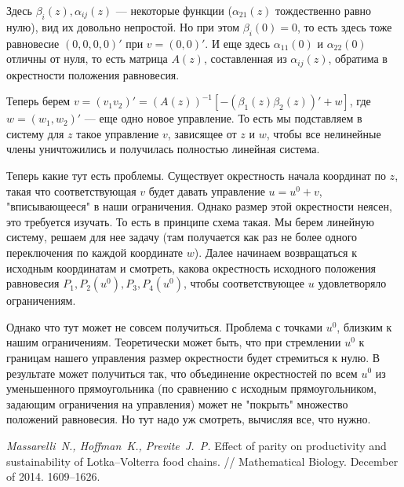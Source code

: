 \documentclass[11pt]{article}
\begin{document}
Здесь $\beta_i(z), \alpha_{ij}(z)$ --- некоторые функции ($\alpha_{21}(z)$ тождественно равно нулю), вид их довольно непростой.
Но при этом $\beta_i(0)=0$, то есть здесь тоже равновесие $(0,0,0,0)'$ при $v=(0,0)'$. И еще здесь $\alpha_{11}(0)$ и $\alpha_{22}(0)$ отличны от нуля, то есть матрица $A(z)$, составленная из $\alpha_{ij}(z)$, обратима в окрестности положения равновесия.

Теперь берем $v=(v_1 v_2)'=(A(z))^{-1}[-(\beta_1(z) \beta_2(z))'+w]$, где $w=(w_1,w_2)'$ --- еще одно новое управление.
То есть мы подставляем в систему для $z$ такое управление $v$, зависящее от $z$ и $w$, чтобы все нелинейные члены
уничтожились и получилась полностью линейная система.

Теперь какие тут есть проблемы. Существует окрестность начала координат по $z$, такая что соответствующая $v$ будет давать управление $u=u^0+v$, "вписывающееся" в наши ограничения. Однако размер этой окрестности неясен, это требуется изучать.
То есть в принципе схема такая. Мы берем линейную систему, решаем для нее задачу (там получается как раз не более
одного переключения по каждой координате $w$). Далее начинаем возвращаться к исходным координатам и смотреть,
какова окрестность исходного положения равновесия $P_1, P_2(u^0), P_3, P_4(u^0)$, чтобы соответствующее $u$ удовлетворяло
ограничениям.

Однако что тут может не совсем получиться. Проблема с точками $u^0$, близким к нашим ограничениям. Теоретически
может быть, что при стремлении $u^0$ к границам нашего управления размер окрестности будет стремиться к нулю.
В результате может получиться так, что объединение окрестностей по всем $u^0$ из уменьшенного прямоугольника
(по сравнению с исходным прямоугольником, задающим ограничения на управления) может не "покрыть" множество положений
равновесия. Но тут надо уж смотреть, вычисляя все, что нужно.

\clearpage
\newpage
\begin{thebibliography}{0}
 {\it Massarelli~N., Hoffman~K., Previte~J.~P.} Effect of parity on productivity and sustainability of Lotka–Volterra food chains. // Mathematical Biology. December of 2014. 1609--1626.
\end{thebibliography}
\end{document}
